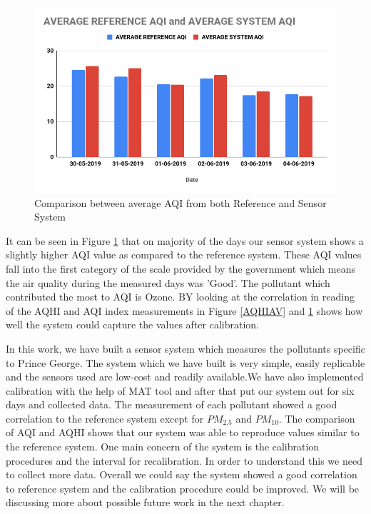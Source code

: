  \begin{figure}[h]
  \begin{center}
  \includegraphics[scale=0.60]{images/figure92.png}
  \end{center}
  \caption{Comparison between average AQI from both Reference and Sensor System}
  \label{AQIAV}
  \hspace{1 cm}
\end{figure}

It can be seen in Figure \ref{AQIAV} that on majority of the days our sensor system shows a slightly higher AQI value as compared to the reference system. These AQI values fall into the first category of the scale provided by the government which means the air quality during the measured days was 'Good'. The pollutant which contributed the most to AQI is Ozone.
BY looking at the correlation in reading of the AQHI and AQI index measurements in Figure \ref{AQHIAV} and \ref{AQIAV} shows how well the system could capture the values after calibration. 


In this work, we have built a sensor system which measures the pollutants specific to Prince George. The system which we have built is very simple, easily replicable and the sensors used are low-cost and readily available.We have also implemented calibration with the help of MAT tool and after that put our system out for six days and collected data. The measurement of each pollutant showed a good correlation to the reference system except for $PM_{2.5}$ and $PM_{10}$. The comparison of AQI and AQHI shows that our system was able to reproduce values similar to the reference system. One main concern of the system is the calibration procedures and the interval for recalibration. In order to understand this we need to collect more data. Overall we could say the system showed a good correlation to reference system  and the calibration procedure could be improved. We will be discussing more about possible future work in the next chapter.
